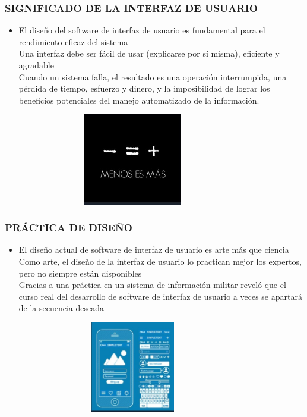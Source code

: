 \documentclass[11pt]{beamer}
\begin{document}
\begin{frame}
\frametitle{SIGNIFICADO DE LA INTERFAZ DE USUARIO}
\begin{itemize}
\item El diseño del software de interfaz de usuario es fundamental para el rendimiento eficaz del sistema\\
Una interfaz debe ser  fácil de usar (explicarse por sí misma), eficiente y agradable\\
Cuando un sistema falla, el resultado es una operación interrumpida, una pérdida de tiempo, esfuerzo y dinero, y la imposibilidad de lograr los beneficios potenciales del manejo automatizado de la información.


\begin{figure}[t]
\includegraphics[width=8cm, height=4cm]{logo.jpg}
\centering
\end{figure}
\end{itemize}
\end{frame}

\begin{frame}
\frametitle{PRÁCTICA DE DISEÑO}
\begin{itemize}
\item El diseño actual de software de interfaz de usuario es arte más que ciencia\\
Como arte, el diseño de la interfaz de usuario lo practican mejor los expertos, pero no siempre están disponibles\\
Gracias a una práctica en un sistema de información militar reveló que el curso real del desarrollo de software de interfaz de usuario a veces se apartará de la secuencia deseada



\begin{figure}[t]
\includegraphics[width=8cm, height=4cm]{table.jpg}
\centering
\end{figure}
\end{itemize}
\end{frame}
\end{document}
